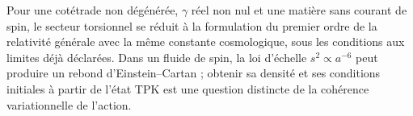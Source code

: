 Pour une cotétrade non dégénérée, \(\gamma\) réel non nul et une matière sans courant de spin, le secteur torsionnel se réduit à la formulation du premier ordre de la relativité générale avec la même constante cosmologique, sous les conditions aux limites déjà déclarées. Dans un fluide de spin, la loi d’échelle \(s^2\propto a^{-6}\) peut produire un rebond d’Einstein--Cartan ; obtenir sa densité et ses conditions initiales à partir de l’état TPK est une question distincte de la cohérence variationnelle de l’action.
